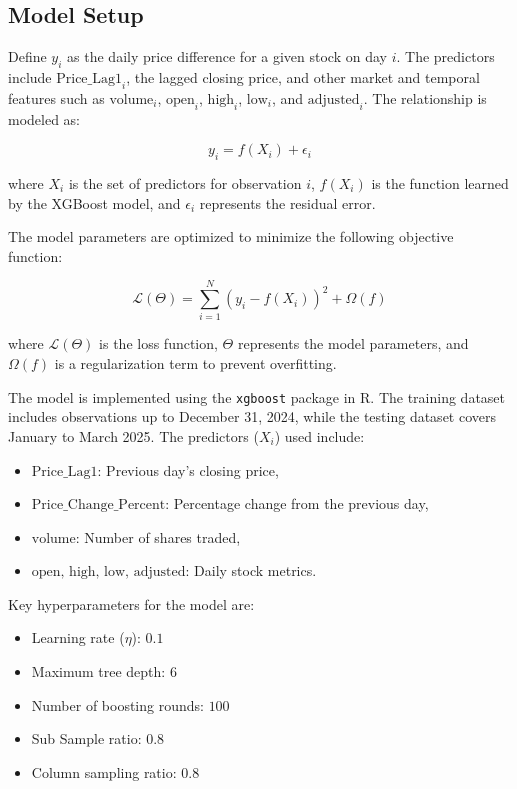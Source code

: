 \documentclass[
  letterpaper,
  DIV=11,
  numbers=noendperiod]{scrartcl}
\providecommand{\tightlist}{%
  \setlength{\itemsep}{0pt}\setlength{\parskip}{0pt}}\usepackage{longtable,booktabs,array}
\begin{document}
\subsection{Model Setup}\label{model-setup}

Define \(y_i\) as the daily price difference for a given stock on day
\(i\). The predictors include \(\text{Price\_Lag1}_i\), the lagged
closing price, and other market and temporal features such as
\(\text{volume}_i\), \(\text{open}_i\), \(\text{high}_i\),
\(\text{low}_i\), and \(\text{adjusted}_i\). The relationship is modeled
as:

\[
y_i = f(X_i) + \epsilon_i
\]

where \(X_i\) is the set of predictors for observation \(i\), \(f(X_i)\)
is the function learned by the XGBoost model, and \(\epsilon_i\)
represents the residual error.

The model parameters are optimized to minimize the following objective
function:

\[
\mathcal{L}(\Theta) = \sum_{i=1}^N \left(y_i - f(X_i)\right)^2 + \Omega(f)
\]

where \(\mathcal{L}(\Theta)\) is the loss function, \(\Theta\)
represents the model parameters, and \(\Omega(f)\) is a regularization
term to prevent overfitting.

The model is implemented using the \texttt{xgboost} package in R. The
training dataset includes observations up to December 31, 2024, while
the testing dataset covers January to March 2025. The predictors
(\(X_i\)) used include:

\begin{itemize}
\tightlist
\item
  \(\text{Price\_Lag1}\): Previous day's closing price,
\item
  \(\text{Price\_Change\_Percent}\): Percentage change from the previous
  day,
\item
  \(\text{volume}\): Number of shares traded,
\item
  \(\text{open, high, low, adjusted}\): Daily stock metrics.
\end{itemize}

Key hyperparameters for the model are:

\begin{itemize}
\tightlist
\item
  Learning rate (\(\eta\)): \(0.1\)
\item
  Maximum tree depth: \(6\)
\item
  Number of boosting rounds: \(100\)
\item
  Sub Sample ratio: \(0.8\)
\item
  Column sampling ratio: \(0.8\)
\end{itemize}
\end{document}
